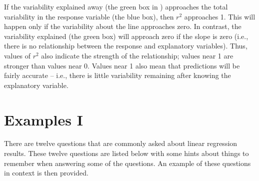 \documentclass[10pt,openany]{book}\usepackage[]{graphicx}\usepackage[]{color}
\begin{document}
If the variability explained away (the green box in ) approaches the total variability in the response variable (the blue box), then $r^{2}$ approaches 1.  This will happen only if the variability about the line approaches zero.  In contrast, the variability explained (the green box) will approach zero if the slope is zero (i.e., there is no relationship between the response and explanatory variables).  Thus, values of $r^{2}$ also indicate the strength of the relationship; values near 1 are stronger than values near 0.  Values near 1 also mean that predictions will be fairly accurate -- i.e., there is little variability remaining after knowing the explanatory variable.



\section{Examples I}
There are twelve questions that are commonly asked about linear regression results.  These twelve questions are listed below with some hints about things to remember when answering some of the questions.  An example of these questions in context is then provided.
\end{document}
